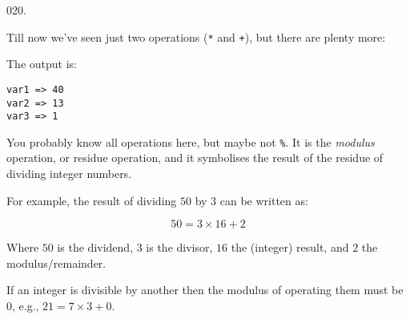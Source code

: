 \documentclass[]{book}
\newenvironment{Shaded}{}{}
\newcommand{\BuiltInTok}[1]{#1}
\newcommand{\DataTypeTok}[1]{\textcolor[rgb]{0.56,0.13,0.00}{#1}}
\newcommand{\DecValTok}[1]{\textcolor[rgb]{0.25,0.63,0.44}{#1}}
\newcommand{\NormalTok}[1]{#1}
\newcommand{\StringTok}[1]{\textcolor[rgb]{0.25,0.44,0.63}{#1}}
\begin{document}
\vspace{2mm}\noindent\hrulefill{}

\begin{minipage}{\linewidth}\noindent
{\tiny 020.}\\
\begin{minipage}[t]{.485\linewidth}

Till now we've seen just two operations (\texttt{*} and \texttt{+}), but
there are plenty more:

\begin{framed}

\begin{Shaded}
\end{Shaded}

\end{framed}

\end{minipage}
\hfill
\begin{minipage}[t]{.485\linewidth}

The output is:

\begin{framed}

\begin{verbatim}
var1 => 40
var2 => 13
var3 => 1
\end{verbatim}

\end{framed}

You probably know all operations here, but maybe not \texttt{\%}. It is
the \emph{modulus} operation, or residue operation, and it symbolises
the result of the residue of dividing integer numbers.

For example, the result of dividing \(50\) by \(3\) can be written as:

\[ 50 = 3 \times 16 + 2 \]

Where \(50\) is the dividend, \(3\) is the divisor, \(16\) the (integer)
result, and \(2\) the modulus/remainder.

If an integer is divisible by another then the modulus of operating them
must be \(0\), e.g., \(21 = 7 \times 3 + 0\).

\end{minipage}
\end{minipage}
\end{document}
